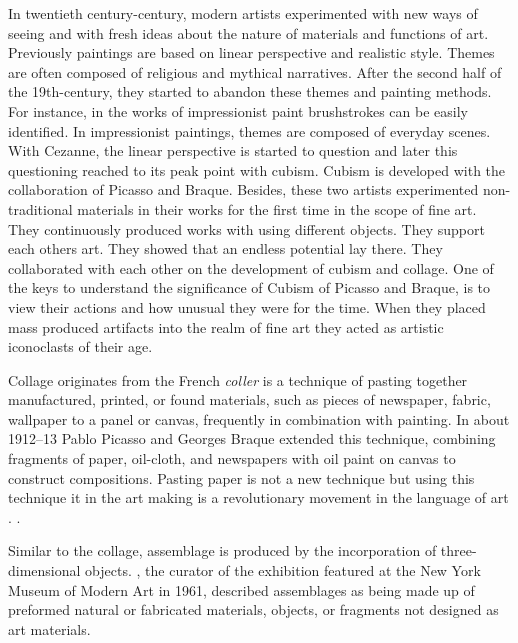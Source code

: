 In twentieth century-century, modern artists experimented with new ways of seeing and with fresh ideas about the nature of materials and functions of art. Previously paintings are based on linear perspective and realistic style. Themes are often composed of religious and mythical narratives. After the second half of the 19th-century, they started to abandon these themes and painting methods. For instance, in the works of impressionist paint brushstrokes can be easily identified. In impressionist paintings, themes are composed of everyday scenes. With Cezanne, the linear perspective is started to question and later this questioning reached to its peak point with cubism. Cubism is developed with the collaboration of Picasso and Braque. Besides, these two artists experimented non-traditional materials in their works for the first time in the scope of fine art. They continuously produced works with using different objects. They support each others art. They showed that an endless potential lay there. They collaborated with each other on the development of cubism and collage. One of the keys to understand the significance of Cubism of Picasso and Braque, is to view their actions and how unusual they were for the time. When they placed mass produced artifacts into the realm of fine art they acted as artistic iconoclasts of their age.

Collage originates from the French \textit{coller} is a technique of pasting together manufactured, printed, or found materials, such as pieces of newspaper, fabric, wallpaper to a panel or canvas, frequently in combination with painting. In about 1912–13 Pablo Picasso and Georges Braque extended this technique, combining fragments of paper, oil-cloth, and newspapers with oil paint on canvas to construct compositions. Pasting paper is not a new technique but using this technique it in the art making is a revolutionary movement in the language of art \citep{waldman1992collage}.  \citep{greenberg1984collage}.

Similar to the collage, assemblage is produced by the incorporation of three-dimensional objects. \cite{seitz1961art}, the curator of the exhibition  featured at the New York Museum of Modern Art in 1961, described assemblages as being made up of preformed natural or fabricated materials, objects, or fragments not designed as art materials.

